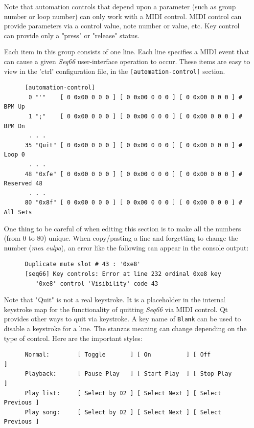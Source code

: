    Note that automation controls that depend upon a parameter (such as group
   number or loop number) can only work with a MIDI control.
   MIDI control can provide parameters via a control value, note number or value,
   etc.
   Key control can provide only a "press" or "release" status.
   
   Each item in this group consists of one line.  Each line
   specifies a MIDI event that can cause a given
   \textsl{Seq66} user-interface operation to occur.
   These items are easy to view in the 'ctrl' configuration file,
   in the \texttt{[automation-control]} section.

   \begin{verbatim}
      [automation-control]
       0 "'"    [ 0 0x00 0 0 0 ] [ 0 0x00 0 0 0 ] [ 0 0x00 0 0 0 ] # BPM Up
       1 ";"    [ 0 0x00 0 0 0 ] [ 0 0x00 0 0 0 ] [ 0 0x00 0 0 0 ] # BPM Dn
       . . .
      35 "Quit" [ 0 0x00 0 0 0 ] [ 0 0x00 0 0 0 ] [ 0 0x00 0 0 0 ] # Loop 0
       . . .
      48 "0xfe" [ 0 0x00 0 0 0 ] [ 0 0x00 0 0 0 ] [ 0 0x00 0 0 0 ] # Reserved 48
       . . .
      80 "0x8f" [ 0 0x00 0 0 0 ] [ 0 0x00 0 0 0 ] [ 0 0x00 0 0 0 ] # All Sets
   \end{verbatim}

   One thing to be careful of when editing this section is to make
   all the numbers (from 0 to 80) unique. When copy/pasting a line and
   forgetting to change the number (\textsl{mea culpa}),
   an error like the following can appear in the console output:

   \begin{verbatim}
      Duplicate mute slot # 43 : '0xe8'
      [seq66] Key controls: Error at line 232 ordinal 0xe8 key
         '0xe8' control 'Visibility' code 43
   \end{verbatim}

   Note that "Quit" is not a real keystroke.  It is a placeholder in the
   internal keystroke map for the functionality of quitting \textsl{Seq66} via
   MIDI control.  Qt provides other ways to quit via keystroke.  A key name of
   \texttt{Blank} can be used to disable a keystroke for a line.  The stanzas
   meaning can change depending on the type of control.  Here are
   the important styles:

   \begin{verbatim}
      Normal:        [ Toggle       ] [ On          ] [ Off             ]
      Playback:      [ Pause Play   ] [ Start Play  ] [ Stop Play       ]
      Play list:     [ Select by D2 ] [ Select Next ] [ Select Previous ]
      Play song:     [ Select by D2 ] [ Select Next ] [ Select Previous ]
   \end{verbatim}

